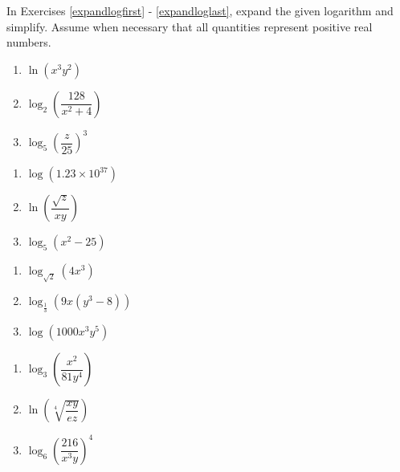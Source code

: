 In Exercises \ref{expandlogfirst} - \ref{expandloglast}, expand the given logarithm and simplify.  Assume when necessary that all quantities represent positive real numbers.

\begin{multicols}{3}
\begin{enumerate}

\item $\ln(x^{3}y^{2})$  \label{expandlogfirst}
\item $\log_{2}\left(\dfrac{128}{x^{2} + 4}\right)$
\item $\log_{5}\left(\dfrac{z}{25}\right)^{3}$ 

\setcounter{HW}{\value{enumi}}
\end{enumerate}
\end{multicols}

\begin{multicols}{3}
\begin{enumerate}
\setcounter{enumi}{\value{HW}}

\item $\log(1.23 \times 10^{37})$ 
\item $\ln\left(\dfrac{\sqrt{z}}{xy}\right)$
\item $\log_{5} \left(x^2 - 25 \right)$ 

\setcounter{HW}{\value{enumi}}
\end{enumerate}
\end{multicols}

\begin{multicols}{3}
\begin{enumerate}
\setcounter{enumi}{\value{HW}}

\item $\log_{\sqrt{2}} \left(4x^3\right)$
\item $\log_{\frac{1}{3}}(9x(y^{3} - 8))$
\item $\log\left(1000x^3y^5\right)$

\setcounter{HW}{\value{enumi}}
\end{enumerate}
\end{multicols}

\begin{multicols}{3}
\begin{enumerate}
\setcounter{enumi}{\value{HW}}

\item $\log_{3} \left(\dfrac{x^2}{81y^4}\right)$
\item $\ln\left(\sqrt[4]{\dfrac{xy}{ez}}\right)$
\item $\log_{6} \left(\dfrac{216}{x^3y}\right)^4$

\setcounter{HW}{\value{enumi}}
\end{enumerate}
\end{multicols}

